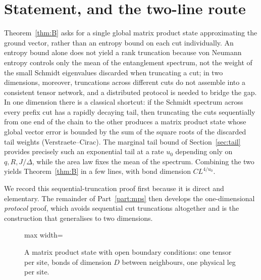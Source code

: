 
\section{Statement, and the two-line route}\label{sec:shortcut}

\begin{inwords}
Theorem~\ref{thm:B} asks for a single global matrix product state approximating
the ground vector, rather than an entropy bound on each cut individually.
An entropy bound alone does not yield a rank truncation because von Neumann
entropy controls only the mean of the entanglement spectrum, not the weight
of the small Schmidt eigenvalues discarded when truncating a cut; in two
dimensions, moreover, truncations across different cuts do not assemble into
a consistent tensor network, and a distributed protocol is needed to bridge
the gap. In one dimension there is a classical shortcut: if the Schmidt
spectrum across every prefix cut has a rapidly decaying tail, then
truncating the cuts sequentially from one end of the chain to the other
produces a matrix product state whose global vector error is bounded by the
sum of the square roots of the discarded tail weights (Verstraete--Cirac).
The marginal tail bound of Section~\ref{sec:tail} provides precisely such an
exponential tail at a rate $u_0$ depending only on $q,R,J/\Delta$, while the
area law fixes the mean of the spectrum. Combining the two yields
Theorem~\ref{thm:B} in a few lines, with bond dimension $CL^{4/u_0}$.

We record this sequential-truncation proof first because it is direct and
elementary. The remainder of Part~\ref{part:mps} then develops the
one-dimensional \emph{protocol} proof, which avoids sequential cut
truncations altogether and is the construction that generalises to two
dimensions.
\end{inwords}

\precisely
\begin{figure}[t]
\centering
\begin{adjustbox}{max width=\linewidth}

\end{adjustbox}
\caption{A matrix product state with open boundary conditions: one tensor per site, bonds of dimension $D$ between neighbours, one physical leg per site.}\label{fig:mps-chain}
\end{figure}

